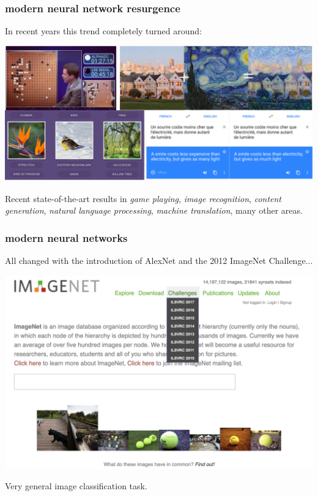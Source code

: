\documentclass[handout,compress]{beamer}
\begin{document}
\begin{frame}
	\frametitle{modern neural network resurgence}
	In recent years this trend completely turned around:
	\begin{center}
		\includegraphics[width=.8\textwidth]{newstuff.png}
	\end{center}
Recent state-of-the-art results in \emph{game playing}, \emph{image recognition}, \emph{content generation}, \emph{natural language processing}, \emph{machine translation}, many other areas.  
\end{frame}

\begin{frame}
	\frametitle{modern neural networks}
	All changed with the introduction of AlexNet and the 2012 ImageNet Challenge...
	\begin{center}
		\includegraphics[width=.8\textwidth]{imagenet_page.png}
		
		Very general image classification task.
	\end{center}
\end{frame}
\end{document}
